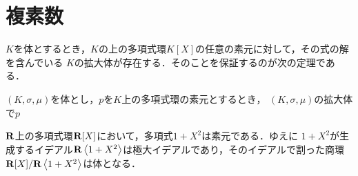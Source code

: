 \section{複素数}
	$K$を体とするとき，$K$の上の多項式環$K[X]$の任意の素元に対して，その式の解を含んでいる
	$K$の拡大体が存在する．そのことを保証するのが次の定理である．
	
	\begin{screen}
		\begin{thm}[単拡大]
			$(K,\sigma,\mu)$を体とし，$p$を$K$上の多項式環の素元とするとき，
			$(K,\sigma,\mu)$の拡大体で$p$
		\end{thm}
	\end{screen}
	
	$\mathbf{R}$上の多項式環$\mathbf{R}[X]$において，多項式$1 + X^2$は素元である．ゆえに
	$1+X^2$が生成するイデアル$\R\inprod<1+X^2>$は極大イデアルであり，そのイデアルで割った商環
	$\R[X]/\R\inprod<1+X^2>$は体となる．
	